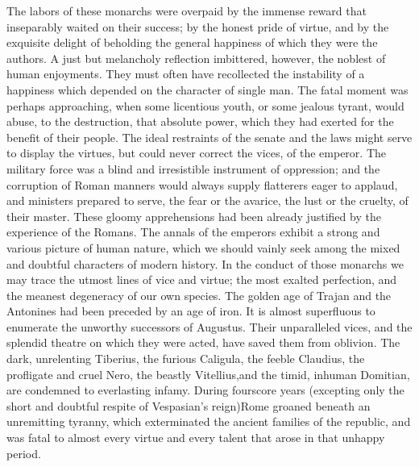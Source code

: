 The labors of these monarchs were overpaid by the immense reward
that inseparably waited on their success; by the honest pride of
virtue, and by the exquisite delight of beholding the general
happiness of which they were the authors. A just but melancholy
reflection imbittered, however, the noblest of human enjoyments.
They must often have recollected the instability of a happiness
which depended on the character of single man. The fatal moment
was perhaps approaching, when some licentious youth, or some
jealous tyrant, would abuse, to the destruction, that absolute
power, which they had exerted for the benefit of their people.
The ideal restraints of the senate and the laws might serve to
display the virtues, but could never correct the vices, of the
emperor. The military force was a blind and irresistible
instrument of oppression; and the corruption of Roman manners
would always supply flatterers eager to applaud, and ministers
prepared to serve, the fear or the avarice, the lust or the
cruelty, of their master. These gloomy apprehensions had been
already justified by the experience of the Romans. The annals of
the emperors exhibit a strong and various picture of human
nature, which we should vainly seek among the mixed and doubtful
characters of modern history. In the conduct of those monarchs we
may trace the utmost lines of vice and virtue; the most exalted
perfection, and the meanest degeneracy of our own species. The
golden age of Trajan and the Antonines had been preceded by an
age of iron. It is almost superfluous to enumerate the unworthy
successors of Augustus. Their unparalleled vices, and the
splendid theatre on which they were acted, have saved them from
oblivion. The dark, unrelenting Tiberius, the furious Caligula,
the feeble Claudius, the profligate and cruel Nero, the beastly
Vitellius,\footnotemark[50] and the timid, inhuman Domitian, are condemned to
everlasting infamy. During fourscore years (excepting only the
short and doubtful respite of Vespasian’s reign)\footnotemark[51] Rome groaned
beneath an unremitting tyranny, which exterminated the ancient
families of the republic, and was fatal to almost every virtue
and every talent that arose in that unhappy period.


